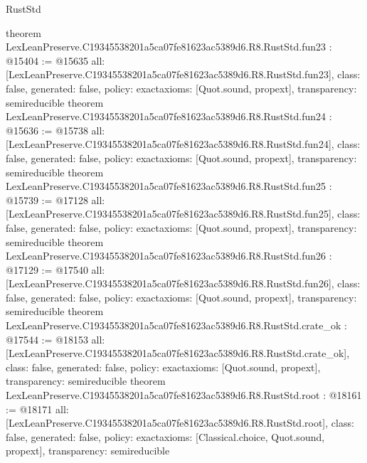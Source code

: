 \begin{lexlean}{RustStd}
\begin{coremodule}
{}
theorem LexLeanPreserve.C19345538201a5ca07fe81623ac5389d6.R8.RustStd.fun23 : @15404 := @15635 {
  all: [LexLeanPreserve.C19345538201a5ca07fe81623ac5389d6.R8.RustStd.fun23],
  class: false,
  generated: false,
  policy: exact{axioms: [Quot.sound, propext]},
  transparency: semireducible
}
theorem LexLeanPreserve.C19345538201a5ca07fe81623ac5389d6.R8.RustStd.fun24 : @15636 := @15738 {
  all: [LexLeanPreserve.C19345538201a5ca07fe81623ac5389d6.R8.RustStd.fun24],
  class: false,
  generated: false,
  policy: exact{axioms: [Quot.sound, propext]},
  transparency: semireducible
}
theorem LexLeanPreserve.C19345538201a5ca07fe81623ac5389d6.R8.RustStd.fun25 : @15739 := @17128 {
  all: [LexLeanPreserve.C19345538201a5ca07fe81623ac5389d6.R8.RustStd.fun25],
  class: false,
  generated: false,
  policy: exact{axioms: [Quot.sound, propext]},
  transparency: semireducible
}
theorem LexLeanPreserve.C19345538201a5ca07fe81623ac5389d6.R8.RustStd.fun26 : @17129 := @17540 {
  all: [LexLeanPreserve.C19345538201a5ca07fe81623ac5389d6.R8.RustStd.fun26],
  class: false,
  generated: false,
  policy: exact{axioms: [Quot.sound, propext]},
  transparency: semireducible
}
theorem LexLeanPreserve.C19345538201a5ca07fe81623ac5389d6.R8.RustStd.crate_ok : @17544 := @18153 {
  all: [LexLeanPreserve.C19345538201a5ca07fe81623ac5389d6.R8.RustStd.crate_ok],
  class: false,
  generated: false,
  policy: exact{axioms: [Quot.sound, propext]},
  transparency: semireducible
}
theorem LexLeanPreserve.C19345538201a5ca07fe81623ac5389d6.R8.RustStd.root : @18161 := @18171 {
  all: [LexLeanPreserve.C19345538201a5ca07fe81623ac5389d6.R8.RustStd.root],
  class: false,
  generated: false,
  policy: exact{axioms: [Classical.choice, Quot.sound, propext]},
  transparency: semireducible
}


\end{coremodule}
\end{lexlean}
